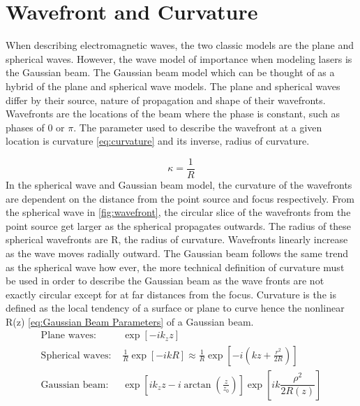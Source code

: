 \documentclass[11pt,a4paper]{book}
\begin{document}
		
	\section{Wavefront and Curvature}
		\label{sec:Wavefront and Curvature}
		When describing electromagnetic waves, the two classic models are the plane and spherical waves. However, the wave model of importance when modeling lasers is the Gaussian beam. The Gaussian beam model which can be thought of as a hybrid of the plane and spherical wave models. The plane and spherical waves differ by their source, nature of propagation and shape of their wavefronts. Wavefronts are the locations of the beam where the phase is constant, such as phases of 0 or $\pi$. The parameter used to describe the wavefront at a given location is curvature \autoref{eq:curvature} and its inverse, radius of curvature.
		
		\begin{equation}
		\label{eq:curvature}
		\kappa = \frac{1}{R}
		\end{equation}
		\noindent In the spherical wave and Gaussian beam model, the curvature of the wavefronts are dependent on the distance from the point source and focus respectively. From the spherical wave in \autoref{fig:wavefront}, the circular slice of the wavefronts from the point source get larger as the spherical propagates outwards. The radius of these spherical wavefronts are R, the radius of curvature. Wavefronts linearly increase as the wave moves radially outward. The Gaussian beam follows the same trend as the spherical wave how ever, the more technical definition of curvature must be used in order to describe the Gaussian beam as the wave fronts are not exactly circular except for at far distances from the focus. Curvature is the is defined as the local tendency of a surface or plane to curve hence the nonlinear R(z) \autoref{eq:Gaussian Beam Parameters} of a Gaussian beam. 
		\begin{equation}
		\label{eq:phase fronts of planes, spherical and Gaussian}
		\begin{split}
		\text{Plane waves: }& \exp{ \left[-i k_z z \right]} \\
		\text{Spherical waves: }& \frac{1}{R}\exp{\left[-ikR\right]} \approx \frac{1}{R}\exp{\left[-i\left(kz +\frac{r^2}{2R}\right)\right]} \\
		\text{Gaussian beam: }& \exp{\left[ik_z z - i\arctan{\left(\frac{z}{z_0}\right)}\right]}
		\exp{\left[ik \dfrac{\rho^2}{2R(z)} \right]}
		\end{split}
		\end{equation}
		
\end{document}
